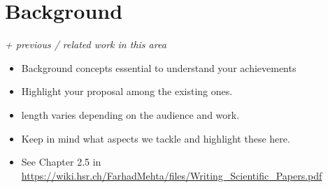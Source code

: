 \chapter{Background}
\label{sec:background}

\textit{+ previous / related work in this area}
\begin{itemize}
    \item Background concepts essential to understand your achievements
    \item Highlight your proposal among the existing ones.
    \item length varies depending on the audience and work.
    \item Keep in mind what aspects we tackle and highlight these here.
    \item See Chapter 2.5 in \url{https://wiki.hsr.ch/FarhadMehta/files/Writing_Scientific_Papers.pdf}
\end{itemize}
